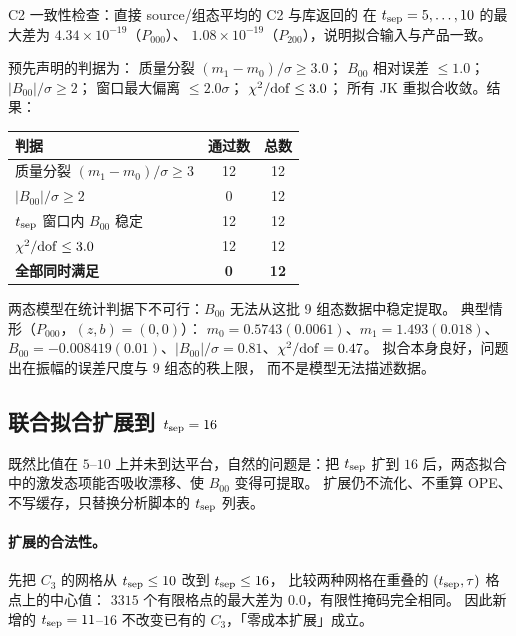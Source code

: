 \documentclass[UTF8,a4paper,11pt]{ctexart}
\newcommand{\code}[1]{\texttt{\detokenize{#1}}}
\begin{document}
C2 一致性检查：直接 source/组态平均的 C2 与库返回的 \code{c2_mean}
在 $t_{\rm sep}=5,\dots,10$ 的最大差为 $4.34\times10^{-19}$（$P_{000}$）、
$1.08\times10^{-19}$（$P_{200}$），说明拟合输入与产品一致。

预先声明的判据为：
质量分裂 $(m_1-m_0)/\sigma\ge3.0$；
$B_{00}$ 相对误差 $\le1.0$；
$|B_{00}|/\sigma\ge2$；
窗口最大偏离 $\le2.0\sigma$；
$\chi^2/{\rm dof}\le3.0$；
所有 JK 重拟合收敛。结果：

\begin{center}
\begin{tabular}{@{}lcc@{}}
\toprule
判据 & 通过数 & 总数 \\
\midrule
质量分裂 $(m_1-m_0)/\sigma\ge3$ & 12 & 12 \\
$|B_{00}|/\sigma\ge2$ & 0 & 12 \\
$t_{\rm sep}$ 窗口内 $B_{00}$ 稳定 & 12 & 12 \\
$\chi^2/{\rm dof}\le3.0$ & 12 & 12 \\
\textbf{全部同时满足} & \textbf{0} & \textbf{12} \\
\bottomrule
\end{tabular}
\end{center}

两态模型在统计判据下不可行：$B_{00}$ 无法从这批 9 组态数据中稳定提取。
典型情形（$P_{000}$，$(z,b)=(0,0)$）：
$m_0=0.5743(0.0061)$、$m_1=1.493(0.018)$、
$B_{00}=-0.008419(0.01)$、$|B_{00}|/\sigma=0.81$、$\chi^2/{\rm dof}=0.47$。
拟合本身良好，问题出在振幅的误差尺度与 9 组态的秩上限，
而不是模型无法描述数据。

\subsection{联合拟合扩展到 $t_{\rm sep}=16$}

既然比值在 $5$--$10$ 上并未到达平台，自然的问题是：把 $t_{\rm sep}$ 扩到 $16$
后，两态拟合中的激发态项能否吸收漂移、使 $B_{00}$ 变得可提取。
扩展仍不流化、不重算 OPE、不写缓存，只替换分析脚本的 $t_{\rm sep}$ 列表。

\paragraph{扩展的合法性。}
先把 $C_3$ 的网格从 $t_{\rm sep}\le10$ 改到 $t_{\rm sep}\le16$，
比较两种网格在重叠的 $(t_{\rm sep},\tau)$ 格点上的中心值：
$3315$ 个有限格点的最大差为 $\mathbf{0.0}$，有限性掩码完全相同。
因此新增的 $t_{\rm sep}=11$--$16$ 不改变已有的 $C_3$，「零成本扩展」成立。
\end{document}
